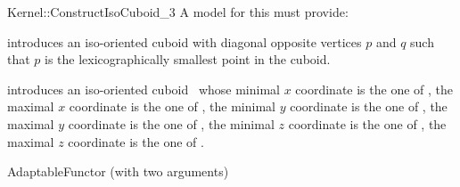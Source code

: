\begin{ccRefFunctionObjectConcept}{Kernel::ConstructIsoCuboid_3}
A model for this must provide:


            {introduces an iso-oriented cuboid  with diagonal
             opposite vertices $p$ and $q$ such that $p$ is the
             lexicographically smallest point in the cuboid.}

            {introduces an iso-oriented cuboid \ccVar\ whose
             minimal $x$ coordinate is the one of , the
             maximal $x$ coordinate is the one of , the
             minimal $y$ coordinate is the one of , the
             maximal $y$ coordinate is the one of , the
             minimal $z$ coordinate is the one of , the
             maximal $z$ coordinate is the one of .}

\ccRefines
AdaptableFunctor (with two arguments)

\ccSeeAlso
{}  \\

\end{ccRefFunctionObjectConcept}
